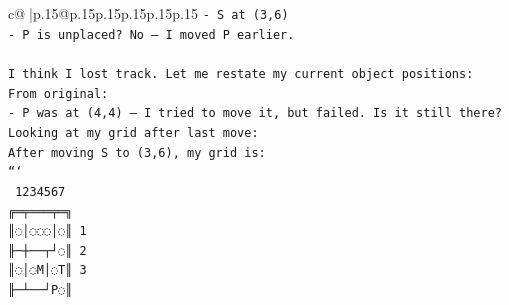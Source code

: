 \documentclass{article}
\begin{document}
{\begin{supertabular}{c@{$\;$}|p{.15\linewidth}@{}p{.15\linewidth}p{.15\linewidth}p{.15\linewidth}p{.15\linewidth}p{.15\linewidth}}
{{{\texttt{{-} S at (3,6)  } \\
\texttt{{-} P is unplaced? No — I moved P earlier.  } \\
\\ 
\texttt{I think I lost track. Let me restate my current object positions:  } \\
\texttt{From original:  } \\
\texttt{{-} P was at (4,4) — I tried to move it, but failed. Is it still there?  } \\
\texttt{Looking at my grid after last move:  } \\
\texttt{After moving S to (3,6), my grid is:  } \\
\texttt{```} \\
\texttt{ 1234567} \\
\texttt{╔═╤═══╤═╗} \\
\texttt{║◌│◌◌◌│◌║ 1} \\
\texttt{╟─┼──┬┘◌║ 2} \\
\texttt{║◌│◌M│◌T║ 3} \\
\texttt{╟─┴──┘P◌║} \\
            }
        }
    }
     \\ \\


\end{supertabular}}
\end{document}
